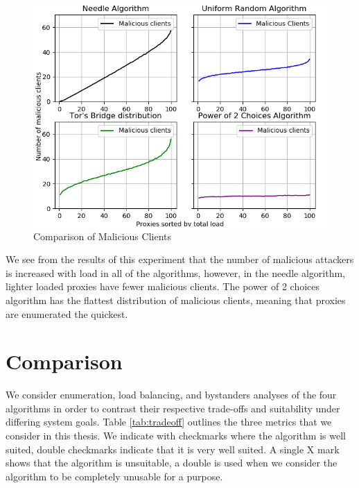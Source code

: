 \begin{figure}[h!]
\centering
     \includegraphics[width=1.0\textwidth]{fig/bystander_comparison_to_n_100.png}
    \caption{Comparison of Malicious Clients}

    \label{fig:bystandercompare}
\end{figure}

We see from the results of this experiment that the number of malicious attackers is increased with load in all of the algorithms, however, in the needle algorithm, lighter loaded proxies have fewer malicious clients. The power of 2 choices algorithm has the flattest distribution of malicious clients, meaning that proxies are enumerated the quickest.



\section{Comparison}

We consider enumeration, load balancing, and bystanders analyses of the four algorithms in order to contrast their respective trade-offs and suitability under differing system goals. Table \ref{tab:tradeoff} outlines the three metrics that we consider in this thesis. We indicate with checkmarks  where the algorithm is well suited, double checkmarks indicate that it is very well suited. A single X mark  shows that the algorithm is unsuitable, a double   is used when we consider the algorithm to be completely unusable for a purpose.

